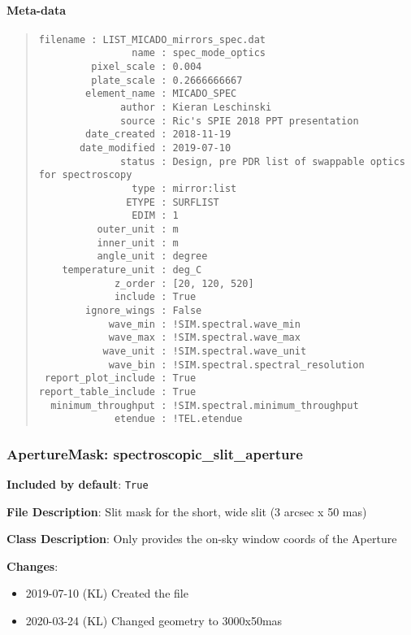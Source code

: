\paragraph{Meta-data%
  \label{meta-data}%
}

\begin{quote}
\begin{alltt}
\begin{lstlisting}[frame=single]
            filename : LIST_MICADO_mirrors_spec.dat
                name : spec_mode_optics
         pixel_scale : 0.004
         plate_scale : 0.2666666667
        element_name : MICADO_SPEC
              author : Kieran Leschinski
              source : Ric's SPIE 2018 PPT presentation
        date_created : 2018-11-19
       date_modified : 2019-07-10
              status : Design, pre PDR list of swappable optics for spectroscopy
                type : mirror:list
               ETYPE : SURFLIST
                EDIM : 1
          outer_unit : m
          inner_unit : m
          angle_unit : degree
    temperature_unit : deg_C
             z_order : [20, 120, 520]
             include : True
        ignore_wings : False
            wave_min : !SIM.spectral.wave_min
            wave_max : !SIM.spectral.wave_max
           wave_unit : !SIM.spectral.wave_unit
            wave_bin : !SIM.spectral.spectral_resolution
 report_plot_include : True
report_table_include : True
  minimum_throughput : !SIM.spectral.minimum_throughput
             etendue : !TEL.etendue
\end{lstlisting}
\end{alltt}
\end{quote}


\subsubsection{ApertureMask: \textquotedbl{}spectroscopic\_slit\_aperture\textquotedbl{}%
  \label{aperturemask-spectroscopic-slit-aperture}%
}

\textbf{Included by default}: \texttt{True}

\textbf{File Description}: Slit mask for the short, wide slit  (3 arcsec x 50 mas)

\textbf{Class Description}: Only provides the on-sky window coords of the Aperture

\textbf{Changes}:

\begin{itemize}
\item 2019-07-10 (KL) Created the file

\item 2020-03-24 (KL) Changed geometry to 3000x50mas
\end{itemize}


